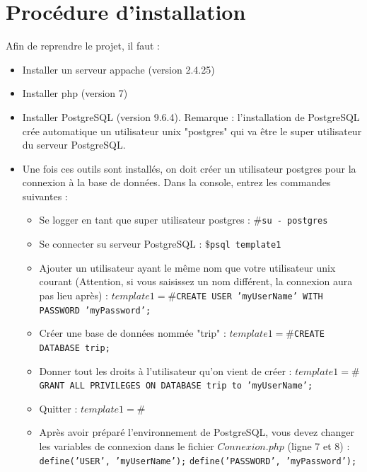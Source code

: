 \documentclass[a4paper, 11pt]{article}
\begin{document}
\section{Procédure d'installation}
Afin de reprendre le projet, il faut :
\begin{itemize}
	\item Installer un serveur appache (version 2.4.25)
	\item Installer php (version 7)
	\item Installer PostgreSQL (version 9.6.4). Remarque : l'installation de PostgreSQL crée automatique un utilisateur unix "postgres" qui va être le super utilisateur du serveur PostgreSQL.
	\item Une fois ces outils sont installés, on doit créer un utilisateur postgres pour la connexion à la base de données. Dans la console, entrez les commandes suivantes :
	\begin{itemize}
		\item Se logger en tant que super utilisateur postgres : 
			\newline$\# $\texttt{su - postgres}
		\item Se connecter su serveur PostgreSQL : 
			\newline$\$ $\texttt{psql template1}
		\item Ajouter un utilisateur ayant le même nom que votre utilisateur unix courant (Attention, si vous saisissez un nom différent, la connexion aura pas lieu après) : 
			\newline$template1=\# $\texttt{CREATE USER 'myUserName' WITH PASSWORD 'myPassword';}
		\item Créer une base de données nommée "trip" : 
			\newline$template1=\# $\texttt{CREATE DATABASE trip;}
		\item Donner tout les droits à l'utilisateur qu'on vient de créer :
			\newline$template1=\# $\texttt{GRANT ALL PRIVILEGES ON DATABASE trip to 'myUserName';}
		\item Quitter : 
			\newline$template1=\# $\texttt{\q}
		\item Après avoir préparé l'environnement de PostgreSQL, vous devez changer les variables de connexion dans le fichier $Connexion.php$ (ligne 7 et 8) :
			\newline \texttt{define('USER', 'myUserName');}
			\newline \texttt{define('PASSWORD', 'myPassword');}

\end{itemize}
\end{itemize}
\end{document}
